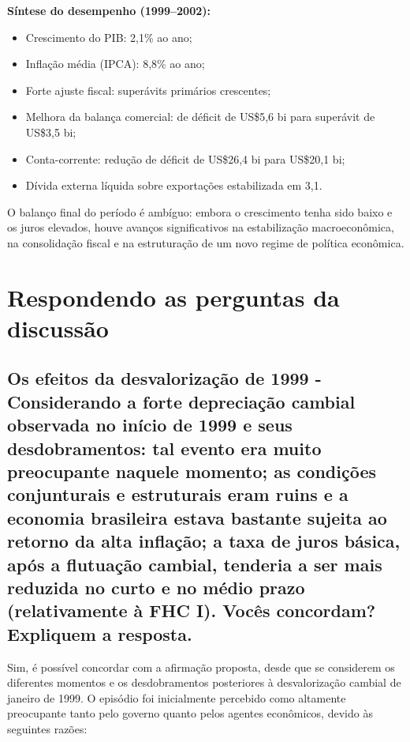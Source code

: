 \documentclass[a4paper,12pt]{article}[abntex2]
\begin{document}
\textbf{Síntese do desempenho (1999–2002):}
\begin{itemize}
    \item Crescimento do PIB: 2,1\% ao ano;
    \item Inflação média (IPCA): 8,8\% ao ano;
    \item Forte ajuste fiscal: superávits primários crescentes;
    \item Melhora da balança comercial: de déficit de US\$5,6 bi para superávit de US\$3,5 bi;
    \item Conta-corrente: redução de déficit de US\$26,4 bi para US\$20,1 bi;
    \item Dívida externa líquida sobre exportações estabilizada em 3,1.
\end{itemize}

O balanço final do período é ambíguo: embora o crescimento tenha sido baixo e os juros elevados, houve avanços significativos na estabilização macroeconômica, na consolidação fiscal e na estruturação de um novo regime de política econômica.

\newpage
\section{\textbf{Respondendo as perguntas da discussão}}
\subsection{\textbf{Os efeitos da desvalorização de 1999 - Considerando a forte depreciação cambial observada no início de 1999 e seus desdobramentos: tal evento era muito preocupante naquele momento; as condições conjunturais e estruturais eram ruins e a economia brasileira estava bastante sujeita ao retorno da alta inflação; a taxa de juros básica, após a flutuação cambial, tenderia a ser mais reduzida no curto e no médio prazo (relativamente à FHC I). Vocês concordam? Expliquem a resposta.}}

Sim, é possível concordar com a afirmação proposta, desde que se considerem os diferentes momentos e os desdobramentos posteriores à desvalorização cambial de janeiro de 1999. O episódio foi inicialmente percebido como altamente preocupante tanto pelo governo quanto pelos agentes econômicos, devido às seguintes razões:
\end{document}
